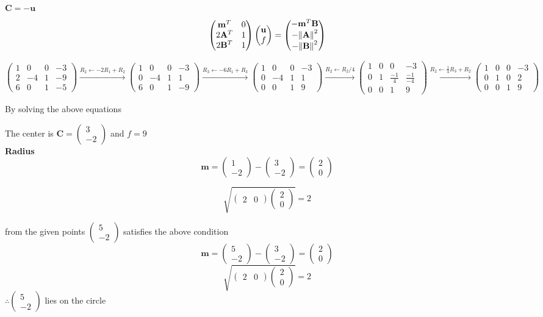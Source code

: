 \documentclass[10pt, a4paper]{article}
\newcommand{\myvec}[1]{\ensuremath{\begin{pmatrix}#1\end{pmatrix}}}
\let\vec\mathbf
\begin{document}
$\vec{C} = -\vec{u}$  
\begin{equation}
	\myvec{\vec{m}^T & 0 \\ 2\vec{A}^T & 1 \\ 2\vec{B}^T & 1}\myvec{\vec{u} \\ f} = \myvec{-\vec{m}^T\vec{B} \\ -\norm{\vec{A}}^2 \\ -\norm{\vec{B}}^2}
\end{equation}
\begin{center}
	$\myvec{1&0&0&-3 \\2 & -4 & 1 & -9 \\ 6 & 0 & 1 & -5 } \xrightarrow[]{R_2 \leftarrow -2R_1 + R_2 } 
	\myvec{1&0&0&-3 \\0 & -4 & 1 & 1 \\ 6 & 0 & 1 & -9 } \xrightarrow[]{R_3 \leftarrow-6R_1 + R_3 } 
	\myvec{1&0&0&-3 \\0 & -4 & 1 & 1 \\ 0 & 0 & 1 & 9 } \xrightarrow[]{R_2 \leftarrow  R_2/4 } 
	\myvec{1&0&0&-3 \\0 & 1 & \frac{-1}{4} & \frac{-1}{-4} \\ 0 & 0 & 1 & 9 } \xrightarrow[]{R_2 \leftarrow \frac{1}{4}R_3+ R_2 } 
	\myvec{1&0&0&-3 \\ 0&1&0&2 \\ 0&0&1&9}$
\end{center}
By solving the above equations

The center is $\vec{C} = \myvec{3 \\ -2}$
 and $f = 9$ \\
\textbf{Radius}\\

\begin{equation}
	\vec{m} = \myvec{1\\-2} - \myvec{3\\-2} = \myvec{2\\0}
\end{equation}

\begin{equation}                                                                                   \sqrt{\myvec{2 &0}\myvec{2\\0}} = 2                                              
\end{equation}

from the given points $\myvec{5\\-2}$ satisfies the above condition
\begin{equation}
\vec{m} = \myvec{5\\-2} - \myvec{3\\-2} = \myvec{2\\0}
\end{equation}
\begin{equation}
	\sqrt{\myvec{2 &0}\myvec{2\\0}} = 2
\end{equation}
$\therefore \myvec{5\\-2}$ lies on the circle 
\end{document}
